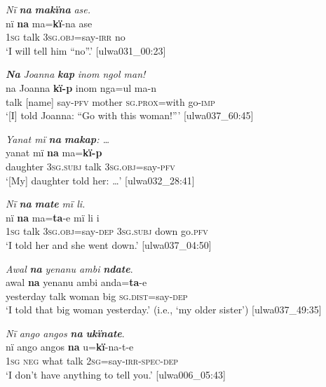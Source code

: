 \ea%
    \label{ex:syntax:201}
          \textit{Nï} \textbf{\textit{na}} \textbf{\textit{makïna}} \textit{ase.}\\
\gll    nï    \textbf{na}    ma=\textbf{kï}{}-na  ase\\
    1\textsc{sg}  talk  \textsc{3sg.obj}=say-\textsc{irr}  no\\
\glt `I will tell him “no”.’ [ulwa031\_00:23]
\z

\ea%
    \label{ex:syntax:202}
          \textbf{\textit{Na}} \textit{Joanna} \textbf{\textit{kap}} \textit{inom ngol man!}\\
\gll    na    Joanna    \textbf{kï-p}    inom  nga=ul      ma-n\\
    talk  [name]    say-\textsc{pfv}  mother  \textsc{sg.prox}=with  go-\textsc{imp}\\
\glt `[I] told Joanna: “Go with this woman!”’ [ulwa037\_60:45]
\z

\ea%
    \label{ex:syntax:203}
          \textit{Yanat mï} \textbf{\textit{na}} \textbf{\textit{makap}}\textit{: …}\\
\gll    yanat    mï      \textbf{na}    ma=\textbf{kï-p}\\
    daughter  \textsc{3sg.subj}  talk  \textsc{3sg.obj}=say-\textsc{pfv}\\
\glt `[My] daughter told her: …’ [ulwa032\_28:41]
\z


\ea%
    \label{ex:syntax:204}
          \textit{Nï} \textbf{\textit{na}} \textbf{\textit{mate}} \textit{mï li.}\\
\gll    nï    \textbf{na}    ma=\textbf{ta}{}-e      mï      li    i\\
    \textsc{1sg}  talk  \textsc{3sg.obj}=say-\textsc{dep}  \textsc{3sg.subj}  down  go.\textsc{pfv}\\
\glt `I told her and she went down.’ [ulwa037\_04:50]
\z

\ea%
    \label{ex:syntax:205}
          \textit{Awal} \textbf{\textit{na}} \textit{yenanu ambi} \textbf{\textit{ndate}}.\\
\gll awal    \textbf{na}    yenanu  ambi  anda=\textbf{ta}{}-e\\
    yesterday  talk  woman  big    \textsc{sg.dist}=say-\textsc{dep}\\
\glt `I told that big woman yesterday.’ (i.e., ‘my older sister’) [ulwa037\_49:35]
\z

\ea%
    \label{ex:syntax:206}
          \textit{Nï ango angos} \textbf{\textit{na}} \textbf{\textit{ukïnate}}.\\
\gll nï    ango  angos  \textbf{na}    u=\textbf{kï}{}-na-t-e\\
    \textsc{1sg}  \textsc{neg}  what  talk  2\textsc{sg}=say-\textsc{irr-spec-dep}\\
\glt `I don’t have anything to tell you.’ [ulwa006\_05:43]
\z

